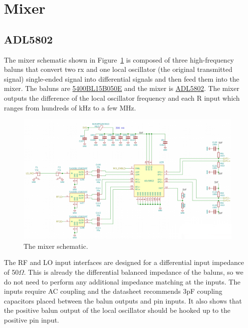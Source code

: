 \section{Mixer}

\subsection{ADL5802}
\label{sec:adl5802}


The mixer schematic shown in Figure~\ref{fig:mixer-sch} is composed of three high-frequency baluns
that convert two rx and one local oscillator (the original transmitted signal) single-ended signal
into differential signals and then feed them into the mixer. The baluns are
\href{https://www.johansontechnology.com/datasheets/baluns/Balun_5400BL15B050.pdf}{5400BL15B050E}
and the mixer is
\href{http://www.analog.com/media/en/technical_documentation/data_sheets/ADL5802.pdf}{ADL5802}. The
mixer outputs the difference of the local oscillator frequency and each R input which ranges from
hundreds of kHz to a few MHz.

\begin{figure}[ht]
  \centering
  \includegraphics[width=\textwidth]{data/mixer-sch.png}
  \caption{The mixer schematic.}
  \label{fig:mixer-sch}
\end{figure}

The RF and LO input interfaces are designed for a differential input impedance of 50$\Omega$. This
is already the differential balanced impedance of the baluns, so we do not need to perform any
additional impedance matching at the inputs. The inputs require AC coupling and the datasheet
recommends 3pF coupling capacitors placed between the balun outputs and pin inputs. It also shows
that the positive balun output of the local oscillator should be hooked up to the positive pin
input.